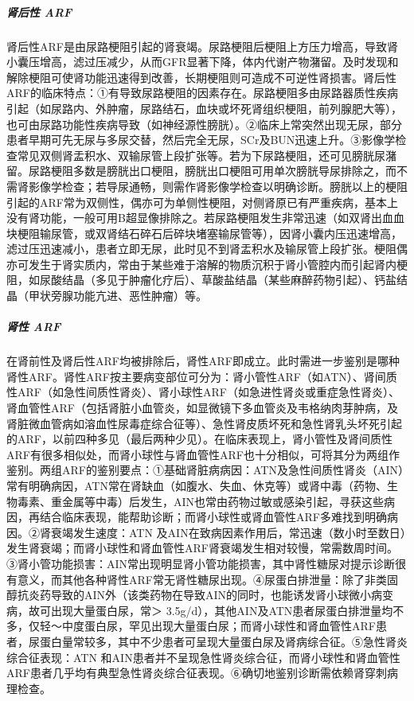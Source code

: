 \subparagraph{肾后性 ARF}

肾后性ARF是由尿路梗阻引起的肾衰竭。尿路梗阻后梗阻上方压力增高，导致肾小囊压增高，滤过压减少，从而GFR显著下降，体内代谢产物潴留。及时发现和解除梗阻可使肾功能迅速得到改善，长期梗阻则可造成不可逆性肾损害。肾后性ARF的临床特点：①有导致尿路梗阻的因素存在。尿路梗阻多由尿路器质性疾病引起（如尿路内、外肿瘤，尿路结石，血块或坏死肾组织梗阻，前列腺肥大等），也可由尿路功能性疾病导致（如神经源性膀胱）。②临床上常突然出现无尿，部分患者早期可先无尿与多尿交替，然后完全无尿，SCr及BUN迅速上升。③影像学检查常见双侧肾盂积水、双输尿管上段扩张等。若为下尿路梗阻，还可见膀胱尿潴留。尿路梗阻多数是膀胱出口梗阻，膀胱出口梗阻可用单次膀胱导尿排除之，而不需肾影像学检查；若导尿通畅，则需作肾影像学检查以明确诊断。膀胱以上的梗阻引起的ARF常为双侧性，偶亦可为单侧性梗阻，对侧肾原已有严重疾病，基本上没有肾功能，一般可用B超显像排除之。若尿路梗阻发生非常迅速（如双肾出血血块梗阻输尿管，或双肾结石碎石后碎块堵塞输尿管等），因肾小囊内压迅速增高，滤过压迅速减小，患者立即无尿，此时见不到肾盂积水及输尿管上段扩张。梗阻偶亦可发生于肾实质内，常由于某些难于溶解的物质沉积于肾小管腔内而引起肾内梗阻，如尿酸结晶（多见于肿瘤化疗后）、草酸盐结晶（某些麻醉药物引起）、钙盐结晶（甲状旁腺功能亢进、恶性肿瘤）等。

\subparagraph{肾性 ARF}

在肾前性及肾后性ARF均被排除后，肾性ARF即成立。此时需进一步鉴别是哪种肾性ARF。肾性ARF按主要病变部位可分为：肾小管性ARF（如ATN）、肾间质性ARF（如急性间质性肾炎）、肾小球性ARF（如急进性肾炎或重症急性肾炎）、肾血管性ARF（包括肾脏小血管炎，如显微镜下多血管炎及韦格纳肉芽肿病，及肾脏微血管病如溶血性尿毒症综合征等）、急性肾皮质坏死和急性肾乳头坏死引起的ARF，以前四种多见（最后两种少见）。在临床表现上，肾小管性及肾间质性ARF有很多相似处，而肾小球性与肾血管性ARF也十分相似，可将其分为两组作鉴别。两组ARF的鉴别要点：①基础肾脏病病因：ATN及急性间质性肾炎（AIN）常有明确病因，ATN常在肾缺血（如腹水、失血、休克等）或肾中毒（药物、生物毒素、重金属等中毒）后发生，AIN也常由药物过敏或感染引起，寻获这些病因，再结合临床表现，能帮助诊断；而肾小球性或肾血管性ARF多难找到明确病因。②肾衰竭发生速度：ATN
及AIN在致病因素作用后，常迅速（数小时至数日）发生肾衰竭；而肾小球性和肾血管性ARF肾衰竭发生相对较慢，常需数周时间。③肾小管功能损害：AIN常出现明显肾小管功能损害，其中肾性糖尿对提示诊断很有意义，而其他各种肾性ARF常无肾性糖尿出现。④尿蛋白排泄量：除了非类固醇抗炎药导致的AIN外（该类药物在导致AIN的同时，也能诱发肾小球微小病变病，故可出现大量蛋白尿，常＞
3.5g/d），其他AIN及ATN患者尿蛋白排泄量均不多，仅轻～中度蛋白尿，罕见出现大量蛋白尿；而肾小球性和肾血管性ARF患者，尿蛋白量常较多，其中不少患者可呈现大量蛋白尿及肾病综合征。⑤急性肾炎综合征表现：ATN
和AIN患者并不呈现急性肾炎综合征，而肾小球性和肾血管性ARF患者几乎均有典型急性肾炎综合征表现。⑥确切地鉴别诊断需依赖肾穿刺病理检查。

